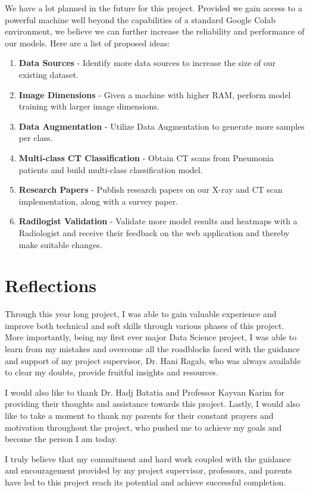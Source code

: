 We have a lot planned in the future for this project. Provided we gain access to a powerful machine well beyond the capabilities of a standard Google Colab environment, we believe we can further increase the reliability and performance of our models. Here are a list of proposed ideas:
\begin{enumerate}
    \item \textbf{Data Sources} - Identify more data sources to increase the size of our existing dataset.
    \item \textbf{Image Dimensions} - Given a machine with higher RAM, perform model training with larger image dimensions.
    \item \textbf{Data Augmentation} - Utilize Data Augmentation to generate more samples per class.
    \item \textbf{Multi-class CT Classification} - Obtain CT scans from Pneumonia patients and build multi-class classification model.
    \item \textbf{Research Papers} - Publish research papers on our X-ray and CT scan implementation, along with a survey paper.
    \item \textbf{Radilogist Validation} - Validate more model results and heatmaps with a Radiologist and receive their feedback on the web application and thereby make suitable changes.
\end{enumerate}

\section{Reflections}

Through this year long project, I was able to gain valuable experience and improve both technical and soft skills through various phases of this project. More importantly, being my first ever major Data Science project, I was able to learn from my mistakes and overcome all the roadblocks faced with the guidance and support of my project supervisor, Dr. Hani Ragab, who was always available to clear my doubts, provide fruitful insights and resources. 

I would also like to thank Dr. Hadj Batatia and Professor Kayvan Karim for providing their thoughts and assistance towards this project. Lastly, I would also like to take a moment to thank my parents for their constant prayers and motivation throughout the project, who pushed me to achieve my goals and become the person I am today. 

I truly believe that my commitment and hard work coupled with the guidance and encouragement provided by my project supervisor, professors, and parents have led to this project reach its potential and achieve successful completion.